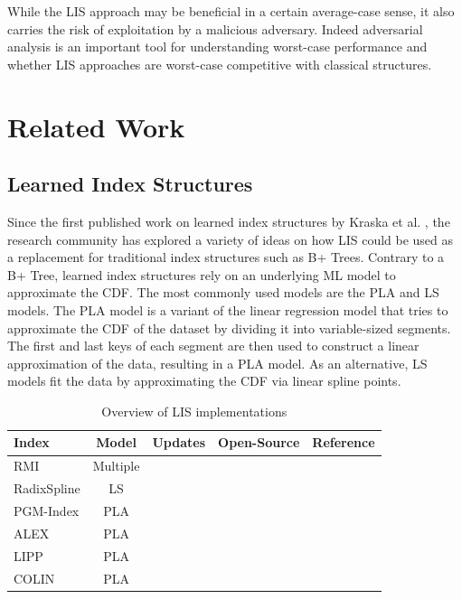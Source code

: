 \documentclass[sigconf]{acmart}
\newcommand{\cmark}{\ding{51}}%
\newcommand{\xmark}{\ding{55}}%
\begin{document}
While the \ac{LIS} approach may be beneficial in a certain average-case sense, it also carries the risk of exploitation by a malicious adversary. Indeed adversarial analysis is an important tool for understanding worst-case performance and whether \ac{LIS} approaches are worst-case competitive with classical structures.


\section{Related Work}
\subsection{Learned Index Structures}

Since the first published work on learned index structures by Kraska et al. \cite{RN385}, the research community has explored a variety of ideas on how \ac{LIS} could be used as a replacement for traditional index structures such as B+ Trees. Contrary to a B+ Tree, learned index structures rely on an underlying \ac{ML} model to approximate the \ac{CDF}. The most commonly used models are the \acf{PLA} and \acf{LS} models. The \ac{PLA} model is a variant of the linear regression model that tries to approximate the \ac{CDF} of the dataset by dividing it into variable-sized segments. The first and last keys of each segment are then used to construct a linear approximation of the data, resulting in a \ac{PLA} model. As an alternative, \ac{LS} models fit the data by approximating the \ac{CDF} via linear spline points.

\begin{table}[tbh]
  \caption{Overview of \ac{LIS} implementations}
  \vspace{-1em}
  \label{tab:lis-implementations}
  \begin{tabular}{lcccc}
    \toprule
    Index & Model & Updates & Open-Source & Reference\\
    \midrule
      RMI                 & Multiple & \xmark & \cmark & \cite{RN385} \\
      RadixSpline         & LS       & \xmark & \cmark & \cite{RN406} \\
      PGM-Index           & PLA      & \xmark & \cmark & \cite{RN400} \\
      ALEX                & PLA      & \cmark & \cmark & \cite{RN388} \\
      LIPP                & PLA      & \cmark & \cmark & \cite{RN696} \\
      COLIN               & PLA      & \cmark & \xmark & \cite{RN721} \\
  \bottomrule
\end{tabular}
\vspace{-1em}
\end{table}
\end{document}
